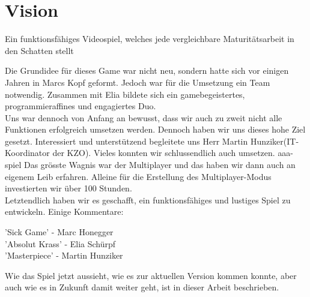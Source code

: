 \chapter{Vision}
\begin{center}
Ein funktionsfähiges Videospiel, welches jede vergleichbare Maturitätsarbeit in den Schatten stellt\\
\end{center}
Die Grundidee für dieses Game war nicht neu, sondern hatte sich vor einigen Jahren in Marcs Kopf geformt.
Jedoch war für die Umsetzung ein Team notwendig. Zusammen mit Elia bildete sich ein gamebegeistertes, programmieraffines und engagiertes Duo.\\
Uns war dennoch von Anfang an bewusst,
dass wir auch zu zweit nicht alle Funktionen erfolgreich umsetzen werden. Dennoch haben wir uns dieses hohe Ziel gesetzt. Interessiert und 
unterstützend begleitete uns Herr Martin Hunziker(IT-Koordinator der KZO).
Vieles konnten wir schlussendlich auch umsetzen. \gls{aaa-spiel}
Das grösste Wagnis war der Multiplayer und das haben wir dann auch an eigenem Leib erfahren.
Alleine für die Erstellung des Multiplayer-Modus investierten wir über 100 Stunden.\\
Letztendlich haben wir es geschafft, ein funktionsfähiges und lustiges Spiel zu entwickeln.
Einige Kommentare:
\begin{center}
    'Sick Game' - Marc Honegger \\
    'Absolut Krass' - Elia Schürpf \\ 
    'Masterpiece' - Martin Hunziker
\end{center}
Wie das Spiel jetzt aussieht, wie es zur aktuellen Version kommen konnte, aber auch wie es in Zukunft damit weiter geht, ist in dieser Arbeit beschrieben.
